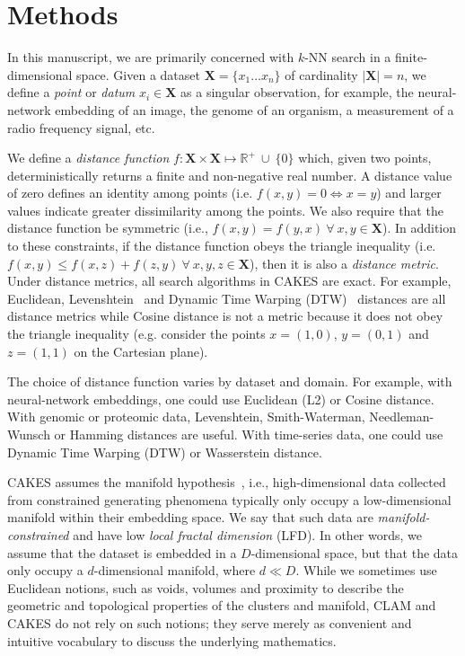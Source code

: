 \section{Methods}
\label{sec:methods}

In this manuscript, we are primarily concerned with $k$-NN search in a finite-dimensional space.
Given a dataset $\textbf{X} = \{x_1 \dots x_n\}$ of cardinality $|\textbf{X}| = n$, we define a \textit{point} or \textit{datum} $x_i \in \textbf{X}$ as a singular observation, for example, the neural-network embedding of an image, the genome of an organism, a measurement of a radio frequency signal, etc.

We define a \textit{distance function} $f : \textbf{X} \times \textbf{X} \mapsto \mathbb{R}^+ \ \cup \ \{0\}$ which, given two points, deterministically returns a finite and non-negative real number.
A distance value of zero defines an identity among points (i.e. $f(x, y) = 0 \Leftrightarrow x = y$) and larger values indicate greater dissimilarity among the points.
We also require that the distance function be symmetric (i.e., $f(x, y) = f(y, x) \ \forall \ x, y \in \textbf{X}$).
In addition to these constraints, if the distance function obeys the triangle inequality (i.e. $f(x, y) \leq f(x, z) + f(z, y) \ \forall \ x, y, z \in \textbf{X}$), then it is also a \textit{distance metric}.
Under distance metrics, all search algorithms in CAKES are exact.
For example, Euclidean, Levenshtein~\cite{levenshtein1966binary} and Dynamic Time Warping (DTW)~\cite{muller2007dynamic} distances are all distance metrics while Cosine distance is not a metric because it does not obey the triangle inequality (e.g. consider the points $x = (1, 0)$, $y = (0, 1)$ and $z = (1, 1)$ on the Cartesian plane).

The choice of distance function varies by dataset and domain.
For example, with neural-network embeddings, one could use Euclidean (L2) or Cosine distance.
With genomic or proteomic data, Levenshtein, Smith-Waterman, Needleman-Wunsch or Hamming distances are useful.
With time-series data, one could use Dynamic Time Warping (DTW) or Wasserstein distance.

CAKES assumes the manifold hypothesis~\cite{fefferman2016testing}, i.e., high-dimensional data collected from constrained generating phenomena typically only occupy a low-dimensional manifold within their embedding space.
We say that such data are \textit{manifold-constrained} and have low \textit{local fractal dimension} (LFD).
In other words, we assume that the dataset is embedded in a $D$-dimensional space, but that the data only occupy a $d$-dimensional manifold, where $d \ll D$.
While we sometimes use Euclidean notions, such as voids, volumes and proximity to describe the geometric and topological properties of the clusters and manifold, CLAM and CAKES do not rely on such notions;
they serve merely as convenient and intuitive vocabulary to discuss the underlying mathematics.

